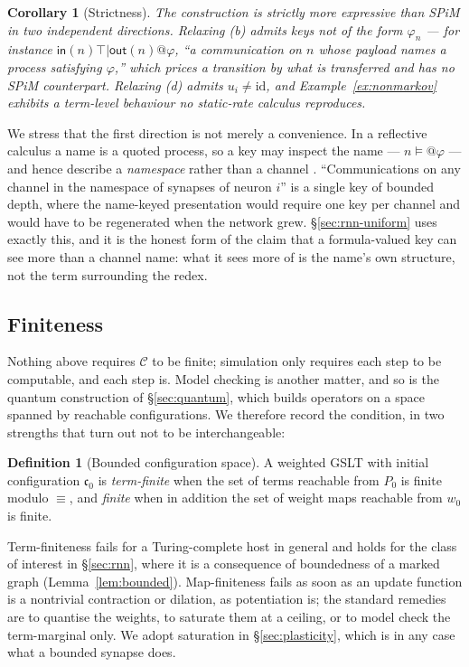 \documentclass[11pt,a4paper]{article}
\theoremstyle{plain}
\newtheorem{corollary}[theorem]{Corollary}
\theoremstyle{definition}
\newtheorem{definition}[theorem]{Definition}
\theoremstyle{remark}
\newcommand{\sepc}{\mathbin{\big|}}
\newcommand{\out}{\mathsf{out}}
\newcommand{\inn}{\mathsf{in}}
\newcommand{\Cfg}{\mathcal{C}}
\newcommand{\wmap}{w}
\begin{document}
\begin{corollary}[Strictness]
\label{cor:strict}
The construction is strictly more expressive than SPiM in two independent directions. Relaxing (b)
admits keys not of the form $\varphi_n$ --- for instance
$\inn(n)\top \sepc \out(n)@\varphi$, ``a communication on $n$ whose payload names a process
satisfying $\varphi$,'' which prices a transition by what is transferred and has no SPiM
counterpart. Relaxing (d) admits $u_i \neq \mathrm{id}$, and Example~\ref{ex:nonmarkov} exhibits a
term-level behaviour no static-rate calculus reproduces.
\end{corollary}

We stress that the first direction is not merely a convenience. In a reflective calculus a name is a
quoted process, so a key may inspect the name --- $n \models @\varphi$ --- and hence describe a
\emph{namespace} rather than a channel \cite{namespace}. ``Communications on any channel in the
namespace of synapses of neuron $i$'' is a single key of bounded depth, where the name-keyed
presentation would require one key per channel and would have to be regenerated when the network
grew. \S\ref{sec:rnn-uniform} uses exactly this, and it is the honest form of the claim that a
formula-valued key can see more than a channel name: what it sees more of is the name's own
structure, not the term surrounding the redex.

\subsection{Finiteness}
\label{sec:finiteness}

Nothing above requires $\Cfg$ to be finite; simulation only requires each step to be computable, and
each step is. Model checking is another matter, and so is the quantum construction of
\S\ref{sec:quantum}, which builds operators on a space spanned by reachable configurations. We
therefore record the condition, in two strengths that turn out not to be interchangeable:

\begin{definition}[Bounded configuration space]
\label{def:bounded}
A weighted GSLT with initial configuration $\mathfrak{c}_0$ is \emph{term-finite} when the set of
terms reachable from $P_0$ is finite modulo $\equiv$, and \emph{finite} when in addition the set of
weight maps reachable from $\wmap_0$ is finite.
\end{definition}

Term-finiteness fails for a Turing-complete host in general and holds for the class of interest in
\S\ref{sec:rnn}, where it is a consequence of boundedness of a marked graph
(Lemma~\ref{lem:bounded}). Map-finiteness fails as soon as an update function is a nontrivial
contraction or dilation, as potentiation is; the standard remedies are to quantise the weights, to
saturate them at a ceiling, or to model check the term-marginal only. We adopt saturation in
\S\ref{sec:plasticity}, which is in any case what a bounded synapse does.
\end{document}
